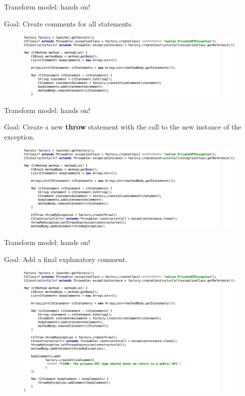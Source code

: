 \documentclass{beamer}
\begin{document}
\begin{frame}[t]{Transform model: hands on!}

Goal: Create comments for all statements.
\begin{figure}
\centering
\includegraphics[width=\textwidth]{figures/transform/transfo-scenario-4.pdf}
\end{figure}
\end{frame}

\begin{frame}[t]{Transform model: hands on!}

Goal: Create a new \textbf{throw} statement with the call to the new instance of the exception. 
\begin{figure}
\centering
\includegraphics[width=\textwidth]{figures/transform/transfo-scenario-5.pdf}
\end{figure}
\end{frame}

\begin{frame}[t]{Transform model: hands on!}

Goal: Add a final explanatory comment.
\begin{figure}
\centering
\includegraphics[width=\textwidth]{figures/transform/transfo-scenario-6.pdf}
\end{figure}
\end{frame}
\end{document}
